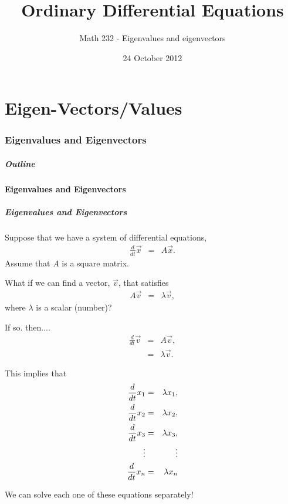 \part{Eigen-Vectors/Values}
\section{Eigenvalues and Eigenvectors}


\title{Ordinary Differential Equations}
\subtitle{Math 232 - Eigenvalues and eigenvectors}
\date{24 October 2012}

\begin{frame}
  \titlepage
\end{frame}

\begin{frame}
  \frametitle{Outline}
  \tableofcontents[currentsection]
\end{frame}


\subsection{Eigenvalues and Eigenvectors}


\begin{frame}
  \frametitle{Eigenvalues and Eigenvectors}

  Suppose that we have a system of differential equations,
  \begin{eqnarray*}
    \frac{d}{dt} \vec{x} & = & A \vec{x}.
  \end{eqnarray*}
  Assume that $A$ is a square matrix.

  What if we can find a vector, $\vec{v}$, that satisfies
  \begin{eqnarray*}
    A \vec{v} & = & \lambda \vec{v},
  \end{eqnarray*}
  where $\lambda$ is a scalar (number)?

\end{frame}


\begin{frame}
  If so. then....
  \begin{eqnarray*}
    \frac{d}{dt} \vec{v} & = & A \vec{v}, \\
    & = & \lambda \vec{v}.
  \end{eqnarray*}
  
  This implies that
  \begin{eqnarray*}
    \deriv{x_1}{t} & = & \lambda x_1, \\
    \deriv{x_2}{t} & = & \lambda x_2, \\
    \deriv{x_3}{t} & = & \lambda x_3, \\
    \vdots         &   & \vdots \\
    \deriv{x_n}{t} & = & \lambda x_n
  \end{eqnarray*}

  We can solve each one of these equations separately!

\end{frame}


